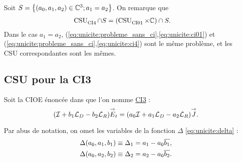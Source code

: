   Soit \(S = \left\lbrace (a_0,a_1,a_2) \in \mathbb C^3 ; a_1 = a_2 \right\rbrace \). On remarque que
  \begin{align}
    \operatorname{CSU}_{\operatorname{CI4}}^{{}}\cap S &= (\operatorname{CSU}_{\operatorname{CI01}}^{{}}\times\mathbb C)\cap S. 
  \end{align}
  Dans le cas \(a_1=a_2\), (\eqref{eq:unicite:probleme_sans_ci},\eqref{eq:unicite:ci01}) et (\eqref{eq:unicite:probleme_sans_ci},\eqref{eq:unicite:ci4}) sont le même problème, et les CSU correspondantes sont les mêmes.
\subsection{CSU pour la CI3}

  Soit la CIOE énoncée dans \cite{marceaux_high-order_2000} que l'on nomme \hyperlink{ci3}{CI3} :
  \begin{equation}
    \label{eq:unicite:ci3:ci3}
    ( {\mathcal{I}} + b_1 {\mathcal{L}_D} - b_2 {\mathcal{L}_R}){\overset{\rightarrow}{E}}_t = (a_0{\mathcal{I}} + a_1 {\mathcal{L}_D} - a_2 {\mathcal{L}_R} ) {\overset{\rightarrow}{J}}.
  \end{equation}

  Par abus de notation, on omet les variables de la fonction \(\Delta\) \eqref{eq:unicite:delta} :
  \begin{align*}
     \Delta(a_0,a_1,b_1) &\equiv \Delta_1 = a_1 - a_0{\overline{b_1}},
     \\
     \Delta(a_0,a_2,b_2) &\equiv \Delta_2 = a_2 - a_0{\overline{b_2}}.
  \end{align*}


